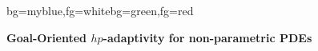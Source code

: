 {
\begin{frame}[plain]
\begin{variableblock}{}{bg=myblue,fg=white}{bg=green,fg=red}
\begin{center}
\textbf{Goal-Oriented $hp$-adaptivity for non-parametric PDEs}
\end{center}
\end{variableblock}
\end{frame}
}